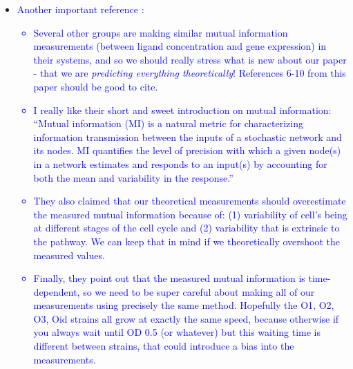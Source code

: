 \begin{itemize}
	\item \textcolor{blue}{Another important reference \cite{Chevalier2015}:
		\begin{itemize}
			\item Several other groups are making similar mutual information measurements (between ligand concentration and gene expression) in their systems, and so we should really stress what is new about our paper - that we are \textit{predicting everything theoretically}! References 6-10 from this paper should be good to cite.
			\item I really like their short and sweet introduction on mutual information: ``Mutual information (MI) is a natural metric for characterizing information transmission between the inputs of a stochastic network and its nodes. MI quantifies the level of precision with which a given node(s) in a network estimates and responds to an input(s) by accounting for both the mean and variability in the response.''
			\item They also claimed that our theoretical measurements should overestimate the measured mutual information because of: (1) variability of cell's being at different stages of the cell cycle and (2) variability that is extrinsic to the pathway. We can keep that in mind if we theoretically overshoot the measured values.
			\item Finally, they point out that the measured mutual information is time-dependent, so we need to be super careful about making all of our measurements using precisely the same method. Hopefully the O1, O2, O3, Oid strains all grow at exactly the same speed, because otherwise if you always wait until OD 0.5 (or whatever) but this waiting time is different between strains, that could introduce a bias into the measurements.
		\end{itemize}
	}
	

\end{itemize}
